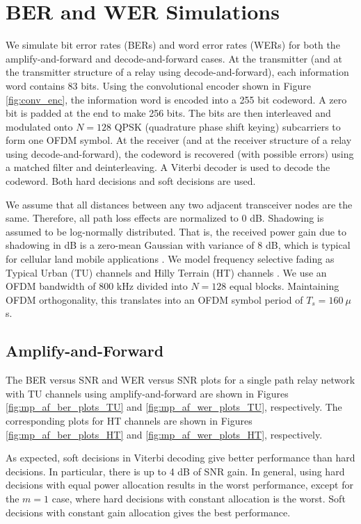 \section{BER and WER Simulations}
\label{sec:mp_bws}

We simulate bit error rates (BERs) and word error rates (WERs) for both the amplify-and-forward and decode-and-forward cases.  At the transmitter (and at the transmitter structure of a relay using decode-and-forward), each information word contains 83 bits.  Using the convolutional encoder shown in Figure \ref{fig:conv_enc}, the information word is encoded into a 255 bit codeword.  A zero bit is padded at the end to make 256 bits.  The bits are then interleaved and modulated onto $N = 128$ QPSK (quadrature phase shift keying) subcarriers to form one OFDM symbol.  At the receiver (and at the receiver structure of a relay using decode-and-forward), the codeword is recovered (with possible errors) using a matched filter and deinterleaving.  A Viterbi decoder is used to decode the codeword.  Both hard decisions and soft decisions are used.

We assume that all distances between any two adjacent transceiver nodes are the same.  Therefore, all path loss effects are normalized to 0 dB.  Shadowing is assumed to be log-normally distributed.  That is, the received power gain due to shadowing in dB is a zero-mean Gaussian with variance of 8 dB, which is typical for cellular land mobile applications \cite{book:Stuber01}.  We model frequency selective fading as Typical Urban (TU) channels and Hilly Terrain (HT) channels \cite{book:Stuber01}.  We use an OFDM bandwidth of 800 kHz divided into $N = 128$ equal blocks.  Maintaining OFDM orthogonality, this translates into an OFDM symbol period of $T_s = 160 \:\mu$s.  

\subsection{Amplify-and-Forward}
\label{subsec:mp_bws_af}

The BER versus SNR and WER versus SNR plots for a single path relay network with TU channels using amplify-and-forward are shown in Figures \ref{fig:mp_af_ber_plots_TU} and \ref{fig:mp_af_wer_plots_TU}, respectively.  The corresponding plots for HT channels are shown in Figures \ref{fig:mp_af_ber_plots_HT} and \ref{fig:mp_af_wer_plots_HT}, respectively.

As expected, soft decisions in Viterbi decoding give better performance than hard decisions.  In particular, there is up to 4 dB of SNR gain.  In general, using hard decisions with equal power allocation results in the worst performance, except for the $m=1$ case, where hard decisions with constant allocation is the worst.  Soft decisions with constant gain allocation gives the best performance.

